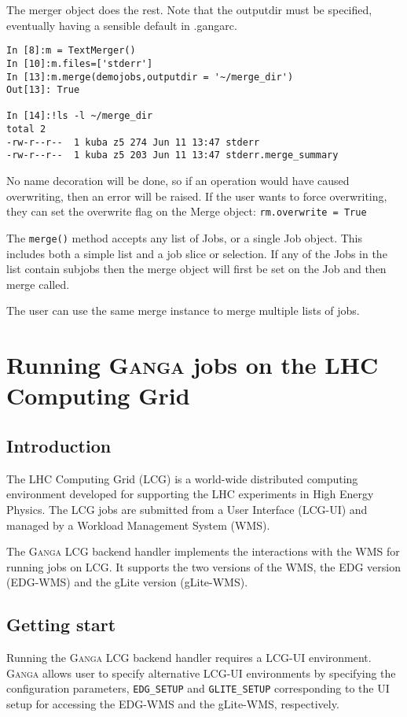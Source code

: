 \documentclass{howto}
\def\ganga {\textsc{Ganga}\xspace}
\begin{document}
The merger object does the rest. Note that the outputdir must be
specified, eventually having a sensible default in .gangarc.

\begin{verbatim}
In [8]:m = TextMerger()
In [10]:m.files=['stderr']
In [13]:m.merge(demojobs,outputdir = '~/merge_dir')
Out[13]: True

In [14]:!ls -l ~/merge_dir
total 2
-rw-r--r--  1 kuba z5 274 Jun 11 13:47 stderr
-rw-r--r--  1 kuba z5 203 Jun 11 13:47 stderr.merge_summary
\end{verbatim}

No name decoration will be done, so if an operation would have caused
overwriting, then an error will be raised.  If the user wants to force
overwriting, they can set the overwrite flag on the Merge object:
\texttt{rm.overwrite = True}

The \texttt{merge()} method accepts any list of Jobs, or a single Job
object. This includes both a simple list and a job slice or selection.
If any of the Jobs in the list contain subjobs then the merge object
will first be set on the Job and then merge called.

The user can use the same merge instance to merge multiple lists of jobs.


\section{Running \ganga jobs on the LHC Computing Grid}
\subsection{Introduction}
The LHC Computing Grid (LCG) is a world-wide distributed computing environment
developed for supporting the LHC experiments in High Energy Physics. The LCG
jobs are submitted from a User Interface (LCG-UI) and managed by a
Workload Management System (WMS).

The \ganga LCG backend handler implements the interactions with the WMS for
running jobs on LCG. It supports the two versions of the WMS, the EDG version
(EDG-WMS) and the gLite version (gLite-WMS).

\subsection{Getting start}
Running the \ganga LCG backend handler requires a LCG-UI environment. \ganga
allows user to specify alternative LCG-UI environments by specifying the configuration parameters,
\texttt{EDG_SETUP} and \texttt{GLITE_SETUP} corresponding to the UI setup for
accessing the EDG-WMS and the gLite-WMS, respectively.
\end{document}
